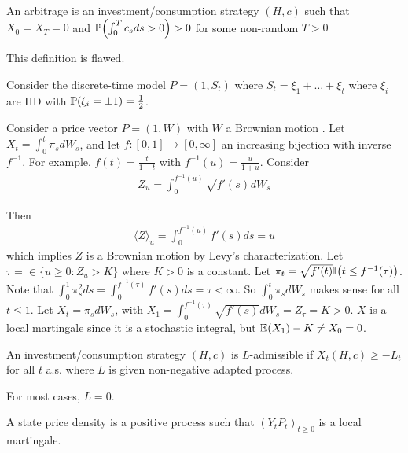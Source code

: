 \begin{defn}[Incomplete]
  \label{defn:continuous_time:19}
  An arbitrage is an investment/consumption strategy $(H, c)$ such
  that $X_{0} = X_{T} = 0$ and $\Prob{\int_{0}^{T} c_{s} ds > 0} > 0$
  for some non-random $T > 0$
\end{defn}

This definition is flawed.

\begin{exmp}
  \label{defn:continuous_time:20}
  Consider the discrete-time model $P = (1, S_{t})$ where $S_{t} =
  \xi_{1} + \dots + \xi_{t}$ where $\xi_{i}$ are IID with
  $\Prob{\xi_{i} = \pm 1} = \frac{1}{2}$.
\end{exmp}

Consider a price vector $P = (1, W)$ with $W$ a Brownian motion . Let
$X_{t} = \int_{0}^{t} \pi_{s} dW_{s}$, and let $f: [0, 1] \rightarrow
[0, \infty]$ an increasing bijection with inverse $f^{-1}$.  For
example, $f(t) = \frac{t}{1-t}$ with $f^{-1}(u) = \frac{u}{1+u}$.
Consider
\begin{align}
  \label{eq:57}
  Z_{u} = \int_{0}^{f^{-1}(u)} \sqrt{f'(s)} dW_{s}
\end{align}

Then
\begin{align}
  \label{eq:58}
  \langle Z \rangle_{u} = \int_{0}^{f^{-1}(u)} f'(s) ds = u
\end{align} which implies $Z$ is a Brownian motion by Levy's
characterization.  Let $\tau = \in \{ u \geq 0 : Z_{u} > K \}$ where
$K > 0$ is a constant.  Let $\pi_{t} = \sqrt{f'(t)} \I{t \leq
  f^{-1}(\tau)}$.  Note that $\int_{0}^{1} \pi^{2}_{s} ds =
\int_{0}^{f^{-1}(\tau)} f'(s) ds = \tau < \infty$.  So $\int_{0}^{t}
\pi_{s} dW_{s}$ makes sense for all $t \leq 1$.  Let $X_{t} = \pi_{s}
dW_{s}$, with $X_{1} = \int_{0}^{f^{-1}(\tau)} \sqrt{f'(s)} dW_{s} =
Z_{\tau} = K > 0$.  $X$ is a local martingale since it is a stochastic
integral, but $\E{X_{1}} - K \neq X_{0} = 0$.

\begin{defn}
  \label{defn:continuous_time:21}
  An investment/consumption strategy $(H, c)$ is $L$-admissible if
  $X_{t}(H, c) \geq -L_{t}$ for all $t$ a.s. where $L$ is given
  non-negative adapted process.

  For most cases, $L = 0$.
\end{defn}

\begin{defn}
  \label{defn:continuous_time:22}
  A state price density is a positive \ito process such that $(Y_{t}
  P_{t})_{t \geq 0}$ is a local martingale.
\end{defn}

